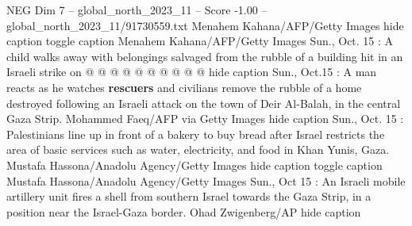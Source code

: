 \begin{textsample}{NEG Dim 7 – global\_north\_2023\_11 – Score -1.00 – global\_north\_2023\_11/91730559.txt}
Menahem Kahana/AFP/Getty Images hide caption toggle caption Menahem Kahana/AFP/Getty Images Sun., Oct. 15 : A child walks away with belongings salvaged from the rubble of a building hit in an Israeli strike on @ @ @ @ @ @ @ @ @ @ hide caption Sun., Oct.15 : A man reacts as he watches \textbf{rescuers} and civilians remove the rubble of a home destroyed following an Israeli attack on the town of Deir Al-Balah, in the central Gaza Strip.
Mohammed Faeq/AFP via Getty Images hide caption Sun., Oct. 15 : Palestinians line up in front of a bakery to buy bread after Israel restricts the area of basic services such as water, electricity, and food in Khan Yunis, Gaza.
Mustafa Hassona/Anadolu Agency/Getty Images hide caption toggle caption Mustafa Hassona/Anadolu Agency/Getty Images Sun., Oct 15 : An Israeli mobile artillery unit fires a shell from southern Israel towards the Gaza Strip, in a position near the Israel-Gaza border.
Ohad Zwigenberg/AP hide caption

\end{textsample}
